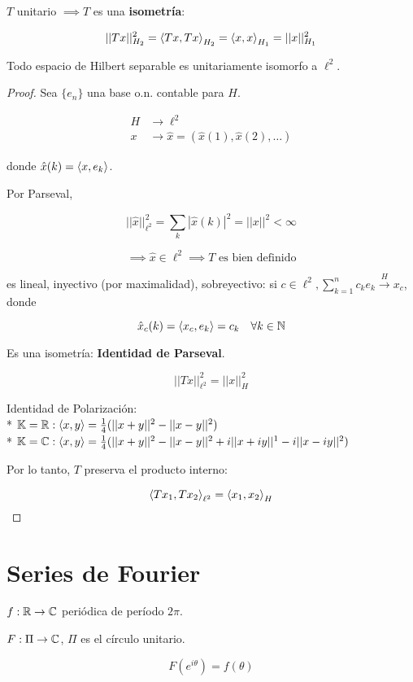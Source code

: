 $T$ unitario $\implies T$ es una \textbf{isometría}:

\[||Tx||_{H_2}^2=\left\langle Tx,Tx\right\rangle_{H_2}=\left\langle x,x\right\rangle_{H_1}=||x||_{H_1}^2\]

\begin{ftheorem}
    Todo espacio de Hilbert separable es unitariamente isomorfo a $\ell^2$.
\end{ftheorem}

\begin{proof}
    Sea $\{e_n\}$ una base o.n. contable para $H$.

    \begin{align*}
        H&\to \ell^2\\
        x&\to \hat x=(\hat x(1),\hat x(2),\ldots)
    \end{align*}

    donde $\hat x(k)=\left\langle x,e_k\right\rangle$.

    Por Parseval,

    \[||\hat x||_{\ell^2}^2=\sum_{k}|\hat x(k)|^2=||x||^2<\infty\]

    \[\implies \hat x\in \ell^2\implies T\text{ es bien definido}\]

    es lineal, inyectivo (por maximalidad), sobreyectivo: si $c\in\ell^2, \sum_{k=1}^n c_k e_k\xrightarrow{H} x_c$, donde 

    \[\hat x_c(k)=\left\langle x_c,e_k\right\rangle=c_k\quad\forall k\in\mathbb{N}\]

    Es una isometría: \textbf{Identidad de Parseval}.

    \[||Tx||_{\ell^2}^2=||x||_H^2\]

    Identidad de Polarización:\\*
    $\mathbb{K}=\mathbb{R}:\left\langle x,y\right\rangle=\frac{1}{4}(||x+y||^2-||x-y||^2)$\\*
    $\mathbb{K}=\mathbb{C}:\left\langle x,y\right\rangle=\frac{1}{4}(||x+y||^2-||x-y||^2+i||x+iy||^1-i||x-iy||^2)$

    Por lo tanto, $T$ preserva el producto interno:

    \[\left\langle Tx_1,Tx_2\right\rangle_{\ell^2}=\left\langle x_1,x_2\right\rangle_H\]
\end{proof}

\section{Series de Fourier}

$f:\mathbb{R}\to\mathbb{C}$ periódica de período $2\pi$.

$F:\Pi\to\mathbb{C}$, $\Pi$ es el círculo unitario.

\[F(e^{i\theta})=f(\theta)\]

